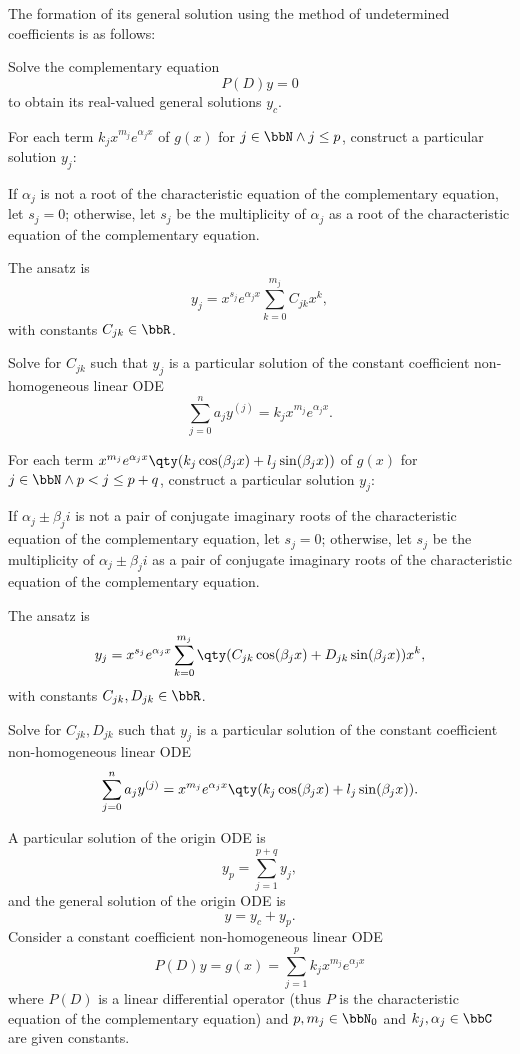 \documentclass[a4paper,12pt]{report}
\begin{document}
The formation of its general solution using the method of undetermined coefficients is as follows:
\ben
\item Solve the complementary equation
\[P(D)y=0\]
to obtain its real-valued general solutions $y_c$.
\item For each term $k_jx^{m_j}e^{\alpha_jx}$ of $g(x)$ for $j\in\bbN\land j\leq p$, construct a particular solution $y_j$:
\ben
\item If $\alpha_j$ is not a root of the characteristic equation of the complementary equation, let $s_j=0$; otherwise, let $s_j$ be the multiplicity of $\alpha_j$ as a root of the characteristic equation of the complementary equation.
\item The ansatz is
\[y_j=x^{s_j}e^{\alpha_jx}\sum_{k=0}^{m_j}C_{jk}x^k,\]
with constants $C_{jk}\in\bbR$.
\item Solve for $C_{jk}$ such that $y_j$ is a particular solution of the constant coefficient non-homogeneous linear ODE
\[\sum_{j=0}^na_jy^{(j)}=k_jx^{m_j}e^{\alpha_jx}.\]
\een
\item For each term $x^{m_j}e^{\alpha_jx}\qty(k_j\cos(\beta_jx)+l_j\sin(\beta_jx))$ of $g(x)$ for $j\in\bbN\land p<j\leq p+q$, construct a particular solution $y_j$:
\ben
\item If $\alpha_j\pm\beta_ji$ is not a pair of conjugate imaginary roots of the characteristic equation of the complementary equation, let $s_j=0$; otherwise, let $s_j$ be the multiplicity of $\alpha_j\pm\beta_ji$ as a pair of conjugate imaginary roots of the characteristic equation of the complementary equation.
\item The ansatz is
\[y_j=x^{s_j}e^{\alpha_jx}\sum_{k=0}^{m_j}\qty(C_{jk}\cos(\beta_jx)+D_{jk}\sin(\beta_jx))x^k,\]
with constants $C_{jk},D_{jk}\in\bbR$.
\item Solve for $C_{jk},D_{jk}$ such that $y_j$ is a particular solution of the constant coefficient non-homogeneous linear ODE
\[\sum_{j=0}^na_jy^{(j)}=x^{m_j}e^{\alpha_jx}\qty(k_j\cos(\beta_jx)+l_j\sin(\beta_jx)).\]
\een
\item A particular solution of the origin ODE is
\[y_p=\sum_{j=1}^{p+q}y_j,\]
and the general solution of the origin ODE is
\[y=y_c+y_p.\]
\een
{}
Consider a constant coefficient non-homogeneous linear ODE
\[P(D)y=g(x)=\sum_{j=1}^pk_jx^{m_j}e^{\alpha_jx}\]
where $P(D)$ is a linear differential operator (thus $P$ is the characteristic equation of the complementary equation) and $p,m_j\in\bbN_0$ and $k_j,\alpha_j\in\bbC$ are given constants.
\end{document}
